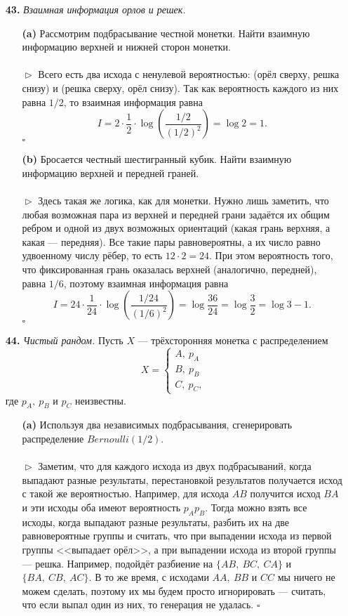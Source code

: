 \documentclass{article}
\begin{document}
\begin{enumerate}
\\
\item[\bfseries 43.] \textit{Взаимная информация орлов и решек.}
\begin{enumerate}
\item[\bfseries (a)] Рассмотрим подбрасывание честной монетки. Найти взаимную информацию верхней и нижней сторон монетки.
\\\\$\vartriangleright$ Всего есть два исхода с ненулевой вероятностью: (орёл сверху, решка снизу) и (решка сверху, орёл снизу). Так как вероятность каждого из них равна $1/2$, то взаимная информация равна
$$I = 2 \cdot \frac{1}{2} \cdot \log \left(\frac{1/2}{(1/2)^2}\right) = \log 2 = 1.$$
$\square$
\\
\item[\bfseries (b)] Бросается честный шестигранный кубик. Найти взаимную информацию верхней и передней граней.
\\\\$\vartriangleright$ Здесь такая же логика, как для монетки. Нужно лишь заметить, что любая возможная пара из верхней и передней грани задаётся их общим ребром и одной из двух возможных ориентаций (какая грань верхняя, а какая --- передняя). Все такие пары равновероятны, а их число равно удвоенному числу рёбер, то есть $12 \cdot 2 = 24$. При этом вероятность того, что фиксированная грань оказалась верхней (аналогично, передней), равна $1/6$, поэтому взаимная информация равна
$$I = 24 \cdot \frac{1}{24} \cdot \log\left(\frac{1/24}{(1/6)^2}\right) = \log \frac{36}{24} = \log \frac{3}{2} = \log 3 - 1.$$
$\square$
\\
\end{enumerate}
\item[\bfseries 44.] \textit{Чистый рандом.} Пусть $X$ --- трёхсторонняя монетка с распределением
$$X = \begin{cases}A,\ p_A\\ B,\ p_B\\ C,\ p_C, \end{cases}$$ где $p_A,\ p_B$ и $p_C$ неизвестны.
\begin{enumerate}
\item[\bfseries (a)] Используя два независимых подбрасывания, сгенерировать распределение $Bernoulli(1/2)$.
\\\\$\vartriangleright$ Заметим, что для каждого исхода из двух подбрасываний, когда выпадают разные результаты, перестановкой результатов получается исход с такой же вероятностью. Например, для исхода $AB$ получится исход $BA$ и эти исходы оба имеют вероятность $p_Ap_B$. Тогда можно взять все исходы, когда выпадают разные результаты,  разбить их на две равновероятные группы и считать, что при выпадении исхода из первой группы <<выпадает орёл>>, а при выпадении исхода из второй группы --- решка. Например, подойдёт разбиение на $\{AB,\ BC,\ CA\}$ и $\{BA,\ CB,\ AC\}.$ В то же время, с исходами $AA,\ BB$ и $CC$ мы ничего не можем сделать, поэтому их мы будем просто игнорировать --- считать, что если выпал один из них, то генерация не удалась. $\square$

\end{enumerate}
\end{enumerate}
\end{document}

